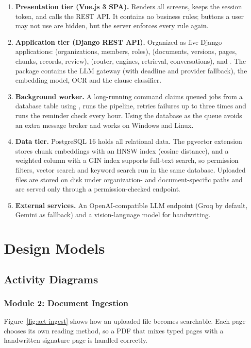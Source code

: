 \begin{enumerate}
\item \textbf{Presentation tier (Vue.js 3 SPA).} Renders all screens, keeps the session token, and
calls the REST API. It contains no business rules; buttons a user may not use are hidden, but the server
enforces every rule again.
\item \textbf{Application tier (Django REST API).} Organized as five Django applications:
 (organizations, members, roles),  (documents, versions, pages, chunks,
records, review),  (router, engines, retrieval, conversations),  and
. The  package contains the LLM gateway (with deadline and provider
fallback), the embedding model, OCR and the clause classifier.
\item \textbf{Background worker.} A long-running  command claims queued jobs from a
database table using , runs the pipeline, retries failures
up to three times and runs the reminder check every hour. Using the database as the queue avoids an extra
message broker and works on Windows and Linux.
\item \textbf{Data tier.} PostgreSQL 16 holds all relational data. The pgvector extension stores chunk
embeddings with an HNSW index (cosine distance), and a weighted  column with a GIN index
supports full-text search, so permission filters, vector search and keyword search run in the same
database. Uploaded files are stored on disk under organization- and document-specific paths and are
served only through a permission-checked endpoint.
\item \textbf{External services.} An OpenAI-compatible LLM endpoint (Groq by default, Gemini as
fallback) and a vision-language model for handwriting.
\end{enumerate}

\section{Design Models}
\subsection{Activity Diagrams}
\subsubsection{Module 2: Document Ingestion}
Figure~\ref{fig:act-ingest} shows how an uploaded file becomes searchable. Each page chooses its own
reading method, so a PDF that mixes typed pages with a handwritten signature page is handled correctly.

